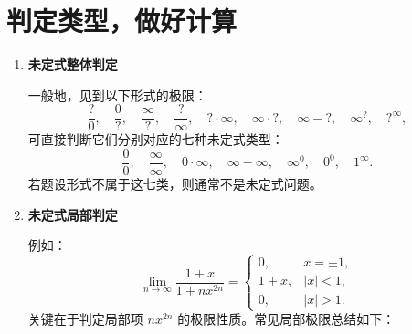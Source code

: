 
\section{判定类型，做好计算}

\begin{enumerate}
    \item \textbf{未定式整体判定}

          一般地，见到以下形式的极限：
          \[
              \frac{?}{0}, \quad \frac{0}{?}, \quad \frac{\infty}{?}, \quad
              \frac{?}{\infty}, \quad ?\cdot\infty, \quad
              \infty\cdot?, \quad \infty-?, \quad \infty^{?}, \quad ?^{\infty},
          \]
          可直接判断它们分别对应的七种未定式类型：
          \[
              \frac{0}{0}, \quad \frac{\infty}{\infty}, \quad 0\cdot\infty, \quad
              \infty-\infty, \quad \infty^{0}, \quad 0^{0}, \quad 1^{\infty}.
          \]
          若题设形式不属于这七类，则通常不是未定式问题。

    \item \textbf{未定式局部判定}

          例如：
          \[
              \lim_{n\to\infty}\frac{1+x}{1+nx^{2n}}=
              \begin{cases}
                  0,   & x=\pm1, \\
                  1+x, & |x|<1,  \\
                  0,   & |x|>1.
              \end{cases}
          \]
          关键在于判定局部项 $nx^{2n}$ 的极限性质。常见局部极限总结如下：


\end{enumerate}
